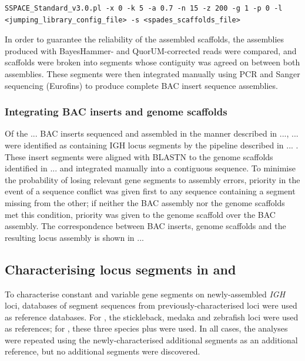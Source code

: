 \begin{lstlisting}
SSPACE_Standard_v3.0.pl -x 0 -k 5 -a 0.7 -n 15 -z 200 -g 1 -p 0 -l <jumping_library_config_file> -s <spades_scaffolds_file>
\end{lstlisting}

In order to guarantee the reliability of the assembled scaffolds, the assemblies produced with BayesHammer- and QuorUM-corrected reads were compared, and scaffolds were broken into segments whose contiguity was agreed on between both assemblies. These segments were then integrated manually using PCR %
and Sanger sequencing (Eurofins) to produce complete BAC insert sequence assemblies. 

\subsubsection{Integrating BAC inserts and genome scaffolds}

Of the ... BAC inserts sequenced and assembled in the manner described in ..., ... were identified as containing IGH locus segments by the pipeline described in ... . These insert segments were aligned with BLASTN to the genome scaffolds identified in ... and integrated manually into a contiguous sequence. To minimise the probability of losing relevant gene segments to assembly errors, priority in the event of a sequence conflict was given first to any sequence containing a segment missing from the other; if neither the BAC assembly nor the genome scaffolds met this condition, priority was given to the genome scaffold over the BAC assembly. The correspondence between BAC inserts, genome scaffolds and the resulting locus assembly is shown in ...

\subsection{Characterising locus segments in \Nfu and \Xma}
\label{sec:locus-char-methods}

To characterise constant and variable gene segments on newly-assembled \textit{IGH} loci, databases of segment sequences from previously-characterised loci were used as reference databases. For \Nfu, the stickleback, medaka and zebrafish loci were used as references; for \Xma, these three species plus \Nfu were used. In all cases, the analyses were repeated using the newly-characterised additional segments as an additional reference, but no additional segments were discovered.

